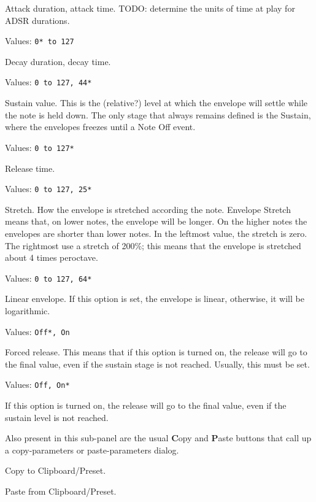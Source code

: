    Attack duration, attack time.
   TODO: determine the units of time at play for ADSR durations.

   Values: \texttt{0* to 127}

   Decay duration, decay time.

   Values: \texttt{0 to 127, 44*}

   Sustain value.
   This is the (relative?) level at which the envelope will settle
   while the note is held down.
   The only stage that always remains defined is the Sustain, where the
   envelopes freezes until a Note Off event.

   Values: \texttt{0 to 127*}

   Release time.

   Values: \texttt{0 to 127, 25*}

   Stretch.
   How the envelope is stretched according the note.
   Envelope Stretch means that, on lower notes, the envelope will be longer.
   On the higher notes the envelopes are shorter than lower notes. In the
   leftmost value, the stretch is zero. The rightmost use a stretch of 200\%;
   this means that the envelope is stretched about 4 times peroctave.

   Values: \texttt{0 to 127, 64*}

   Linear envelope.
   If this option is set, the envelope is linear, otherwise, it will be
   logarithmic.

   Values: \texttt{Off*, On}

   Forced release.
   This means that if this option is turned on, the release will go to the
   final value, even if the sustain stage is not reached. Usually, this must
   be set.

   Values: \texttt{Off, On*}

   If this option is turned on, the release will go to the
   final value, even if the sustain level is not reached.

   Also present in this sub-panel are the usual \textbf{C}opy
   and \textbf{P}aste buttons that call up a copy-parameters or
   paste-parameters dialog.

   Copy to Clipboard/Preset.

   Paste from Clipboard/Preset.

